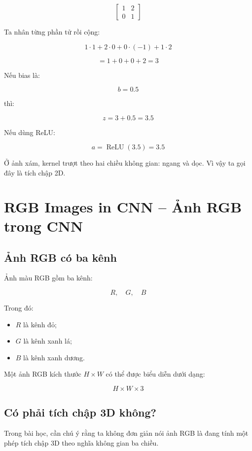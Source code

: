 \[
\begin{bmatrix}
1 & 2\\
0 & 1
\end{bmatrix}
\]

Ta nhân từng phần tử rồi cộng:

\[
1\cdot1+2\cdot0+0\cdot(-1)+1\cdot2
\]

\[
=1+0+0+2=3
\]

Nếu bias là:

\[
b=0.5
\]

thì:

\[
z=3+0.5=3.5
\]

Nếu dùng ReLU:

\[
a=\operatorname{ReLU}(3.5)=3.5
\]

\begin{vidu}
Ở ảnh xám, kernel trượt theo hai chiều không gian: ngang và dọc. Vì vậy ta gọi đây là tích chập 2D.
\end{vidu}

\section{RGB Images in CNN -- Ảnh RGB trong CNN}

\subsection{Ảnh RGB có ba kênh}

Ảnh màu RGB gồm ba kênh:

\[
    R,\quad G,\quad B
\]

Trong đó:

\begin{itemize}
    \item $R$ là kênh đỏ;
    \item $G$ là kênh xanh lá;
    \item $B$ là kênh xanh dương.
\end{itemize}

Một ảnh RGB kích thước $H \times W$ có thể được biểu diễn dưới dạng:

\[
    H \times W \times 3
\]

\subsection{Có phải tích chập 3D không?}

Trong bài học, cần chú ý rằng ta không đơn giản nói ảnh RGB là đang tính một phép tích chập 3D theo nghĩa không gian ba chiều.

